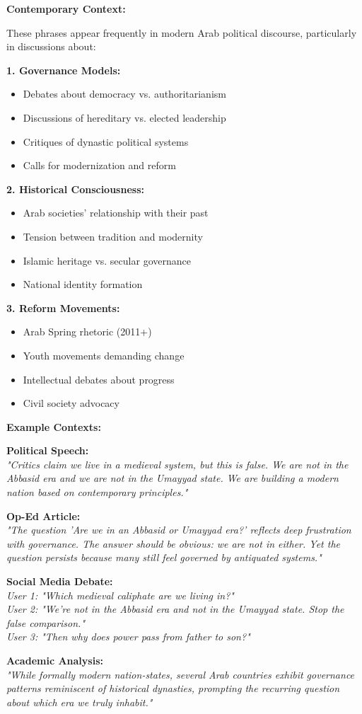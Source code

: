 \documentclass[letterpaper,12pt]{article}
\begin{document}
\begin{tcolorbox}[colback=boxcolor,colframe=headercolor,breakable]
\textbf{Contemporary Context:}

These phrases appear frequently in modern Arab political discourse, particularly in discussions about:

\textbf{1. Governance Models:}
\begin{itemize}
\item Debates about democracy vs. authoritarianism
\item Discussions of hereditary vs. elected leadership
\item Critiques of dynastic political systems
\item Calls for modernization and reform
\end{itemize}

\textbf{2. Historical Consciousness:}
\begin{itemize}
\item Arab societies' relationship with their past
\item Tension between tradition and modernity
\item Islamic heritage vs. secular governance
\item National identity formation
\end{itemize}

\textbf{3. Reform Movements:}
\begin{itemize}
\item Arab Spring rhetoric (2011+)
\item Youth movements demanding change
\item Intellectual debates about progress
\item Civil society advocacy
\end{itemize}

\textbf{Example Contexts:}

\textbf{Political Speech:}\\
\textit{"Critics claim we live in a medieval system, but this is false. We are not in the Abbasid era and we are not in the Umayyad state. We are building a modern nation based on contemporary principles."}

\textbf{Op-Ed Article:}\\
\textit{"The question 'Are we in an Abbasid or Umayyad era?' reflects deep frustration with governance. The answer should be obvious: we are not in either. Yet the question persists because many still feel governed by antiquated systems."}

\textbf{Social Media Debate:}\\
\textit{User 1: "Which medieval caliphate are we living in?"\\
User 2: "We're not in the Abbasid era and not in the Umayyad state. Stop the false comparison."\\
User 3: "Then why does power pass from father to son?"}

\textbf{Academic Analysis:}\\
\textit{"While formally modern nation-states, several Arab countries exhibit governance patterns reminiscent of historical dynasties, prompting the recurring question about which era we truly inhabit."}
\end{tcolorbox}
\end{document}
